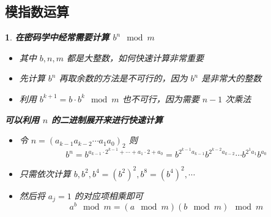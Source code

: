 \documentclass[UTF8]{report}
\theoremstyle{MyLineTheoremStyle} %
\theoremstyle{MyBlockTheoremStyle} %
\theoremstyle{MySubsubsectionStyle} %
\newtheorem{definition}{}
\begin{document}
\subsection{模指数运算}

\begin{definition}
    \textbf{在密码学中经常需要计算 $b^n \mod m$}
    \begin{itemize}
        \item 其中 $b, n, m$ 都是大整数，如何快速计算非常重要
        \item 先计算 $b^n$ 再取余数的方法是不可行的，因为 $b^n$ 是非常大的整数
        \item 利用 $b^{k+1} = b \cdot b^k \mod m$ 也不可行，因为需要 $n - 1$ 次乘法
    \end{itemize}

    \textbf{可以利用 $n$ 的二进制展开来进行快速计算}
    \begin{itemize}
        \item 令 $n = (a_{k-1}a_{k-2} \cdots a_1a_0)_2$ 则
        \[
        b^n = b^{a_{k-1} \cdot 2^{k-1} + \cdots + a_1 \cdot 2 + a_0} = b^{2^{k-1}a_{k-1}} b^{2^{k-2}a_{k-2}} \cdots b^{2^1a_1} b^{a_0}
        \]
        \item 只需依次计算 $b, b^2, b^4 = (b^2)^2, b^8 = (b^4)^2, \cdots$
        \item 然后将 $a_j = 1$ 的对应项相乘即可
        \[
        a^b \mod m = (a \mod m) (b \mod m) \mod m
        \]
    \end{itemize}


\end{definition}
\end{document}
